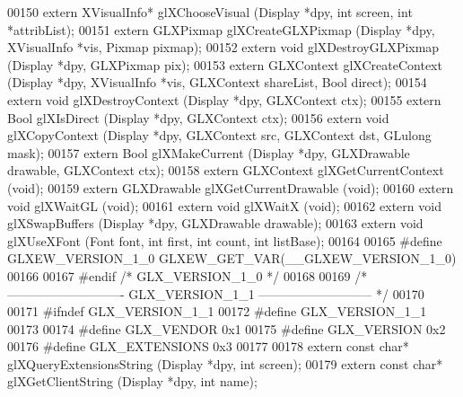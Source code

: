 \begin{DoxyCode}
00150 \textcolor{keyword}{extern} XVisualInfo* glXChooseVisual (Display *dpy, \textcolor{keywordtype}{int} screen, \textcolor{keywordtype}{int} *attribList);
00151 \textcolor{keyword}{extern} GLXPixmap glXCreateGLXPixmap (Display *dpy, XVisualInfo *vis, Pixmap pixmap);
00152 \textcolor{keyword}{extern} \textcolor{keywordtype}{void} glXDestroyGLXPixmap (Display *dpy, GLXPixmap pix);
00153 \textcolor{keyword}{extern} GLXContext glXCreateContext (Display *dpy, XVisualInfo *vis, GLXContext shareList, Bool direct);
00154 \textcolor{keyword}{extern} \textcolor{keywordtype}{void} glXDestroyContext (Display *dpy, GLXContext ctx);
00155 \textcolor{keyword}{extern} Bool glXIsDirect (Display *dpy, GLXContext ctx);
00156 \textcolor{keyword}{extern} \textcolor{keywordtype}{void} glXCopyContext (Display *dpy, GLXContext src, GLXContext dst, 
      GLulong mask);
00157 \textcolor{keyword}{extern} Bool glXMakeCurrent (Display *dpy, GLXDrawable drawable, GLXContext ctx);
00158 \textcolor{keyword}{extern} GLXContext glXGetCurrentContext (\textcolor{keywordtype}{void});
00159 \textcolor{keyword}{extern} GLXDrawable glXGetCurrentDrawable (\textcolor{keywordtype}{void});
00160 \textcolor{keyword}{extern} \textcolor{keywordtype}{void} glXWaitGL (\textcolor{keywordtype}{void});
00161 \textcolor{keyword}{extern} \textcolor{keywordtype}{void} glXWaitX (\textcolor{keywordtype}{void});
00162 \textcolor{keyword}{extern} \textcolor{keywordtype}{void} glXSwapBuffers (Display *dpy, GLXDrawable drawable);
00163 \textcolor{keyword}{extern} \textcolor{keywordtype}{void} glXUseXFont (Font font, \textcolor{keywordtype}{int} first, \textcolor{keywordtype}{int} count, \textcolor{keywordtype}{int} listBase);
00164 
00165 \textcolor{preprocessor}{#define GLXEW\_VERSION\_1\_0 GLXEW\_GET\_VAR(\_\_GLXEW\_VERSION\_1\_0)}
00166 
00167 \textcolor{preprocessor}{#endif }\textcolor{comment}{/* GLX\_VERSION\_1\_0 */}\textcolor{preprocessor}{}
00168 
00169 \textcolor{comment}{/* ---------------------------- GLX\_VERSION\_1\_1 --------------------------- */}
00170 
00171 \textcolor{preprocessor}{#ifndef GLX\_VERSION\_1\_1}
00172 \textcolor{preprocessor}{#define GLX\_VERSION\_1\_1}
00173 
00174 \textcolor{preprocessor}{#define GLX\_VENDOR 0x1}
00175 \textcolor{preprocessor}{#define GLX\_VERSION 0x2}
00176 \textcolor{preprocessor}{#define GLX\_EXTENSIONS 0x3}
00177 
00178 \textcolor{keyword}{extern} \textcolor{keyword}{const} \textcolor{keywordtype}{char}* glXQueryExtensionsString (Display *dpy, \textcolor{keywordtype}{int} screen);
00179 \textcolor{keyword}{extern} \textcolor{keyword}{const} \textcolor{keywordtype}{char}* glXGetClientString (Display *dpy, \textcolor{keywordtype}{int} name);

\end{DoxyCode}
